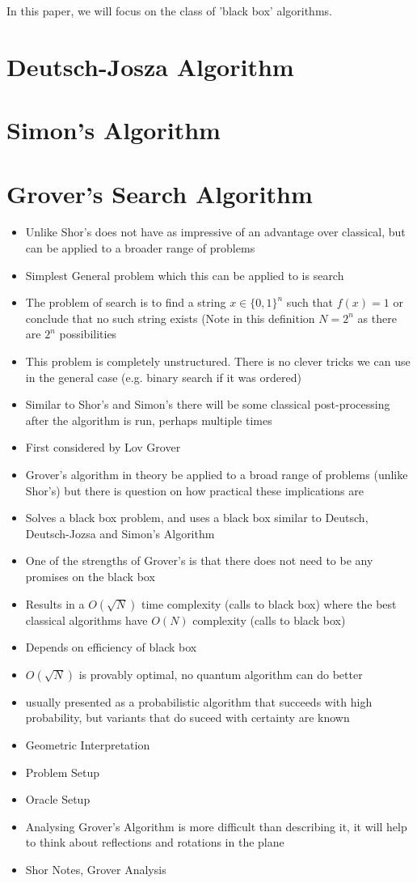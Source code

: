 \documentclass[12pt,twoside,fleqn]{report}
\theoremstyle{thmstyle}
\begin{document}
In this paper, we will focus on the class of 'black box' algorithms.

\section{Deutsch-Josza Algorithm}

\section{Simon's Algorithm}

\section{Grover's Search Algorithm}
\begin{itemize}
\item Unlike Shor's does not have as impressive of an advantage over classical, but can be applied to a broader range of problems
\item Simplest General problem which this can be applied to is search
\item The problem of search is to find a string $x \in \{0,1 \}^n$ such that $f(x) = 1$ or conclude that no such string exists (Note in this definition $N = 2^n$ as there are $2^n$ possibilities
\item This problem is completely unstructured. There is no clever tricks we can use in the general case (e.g. binary search if it was ordered)
\item Similar to Shor's and Simon's there will be some classical post-processing after the algorithm is run, perhaps multiple times
\item First considered by Lov Grover
\item Grover's algorithm in theory be applied to a broad range of problems (unlike Shor's) but there is question on how practical these implications are
\item Solves a black box problem, and uses a black box similar to Deutsch, Deutsch-Jozsa and Simon's Algorithm
\item One of the strengths of Grover's is that there does not need to be any promises on the black box
\item Results in a $O(\sqrt{N})$ time complexity (calls to black box) where the best classical algorithms have $O(N)$ complexity (calls to black box)
\item Depends on efficiency of black box
\item $O(\sqrt{N})$ is provably optimal, no quantum algorithm can do better
\item usually presented as a probabilistic algorithm that succeeds with high probability, but variants that do suceed with certainty are known
\item Geometric Interpretation
\item Problem Setup
\item Oracle Setup
\item Analysing Grover's Algorithm is more difficult than describing it, it will help to think about reflections and rotations in the plane
\item Shor Notes, Grover Analysis
\end{itemize}
\end{document}
